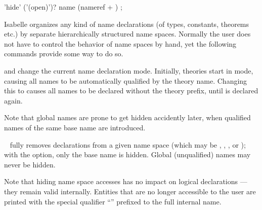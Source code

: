 \begin{isabellebody}
\begin{isamarkuptext}
  \begin{rail}
    'hide' ('(open)')? name (nameref + )
    ;
  \end{rail}

  Isabelle organizes any kind of name declarations (of types,
  constants, theorems etc.) by separate hierarchically structured name
  spaces.  Normally the user does not have to control the behavior of
  name spaces by hand, yet the following commands provide some way to
  do so.

  \begin{description}

  \item \hyperlink{command.global}{\mbox{}} and \hyperlink{command.local}{\mbox{}} change the current
  name declaration mode.  Initially, theories start in \hyperlink{command.local}{\mbox{}} mode, causing all names to be automatically qualified by
  the theory name.  Changing this to \hyperlink{command.global}{\mbox{}} causes all
  names to be declared without the theory prefix, until \hyperlink{command.local}{\mbox{}} is declared again.
  
  Note that global names are prone to get hidden accidently later,
  when qualified names of the same base name are introduced.
  
  \item \hyperlink{command.hide}{\mbox{}}~ fully removes
  declarations from a given name space (which may be ,
  , , or ); with the  option, only the base name is hidden.  Global
  (unqualified) names may never be hidden.
  
  Note that hiding name space accesses has no impact on logical
  declarations --- they remain valid internally.  Entities that are no
  longer accessible to the user are printed with the special qualifier
  ``\isa{{\isachardoublequote}{\isacharquery}{\isacharquery}{\isachardoublequote}}'' prefixed to the full internal name.

  \end{description}%
\end{isamarkuptext}%
\isamarkuptrue%
%
\isadelimtheory
%
\endisadelimtheory
%
\isatagtheory
{}\isamarkupfalse%
%
\endisatagtheory
{\isafoldtheory}%
%
\isadelimtheory
%
\endisadelimtheory
\isanewline
\end{isabellebody}%
